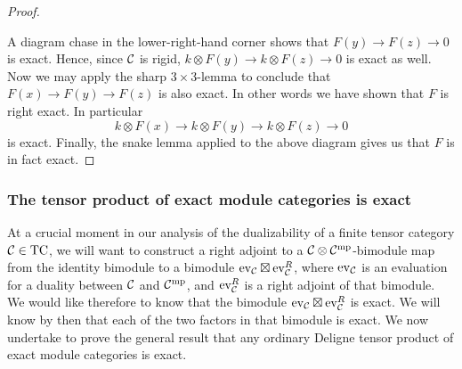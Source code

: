 \documentclass{amsart}
\begin{document}
\begin{proof}
\begin{center}
	\end{center}
	A diagram chase in the lower-right-hand corner shows that $F(y) \to F(z) \to 0$ is exact. Hence, since $\mathcal C$ is rigid,
		$k \otimes F(y) \to k \otimes F(z) \to 0$
	is exact as well. Now we may apply the sharp $3 \times 3$-lemma \cite[Lem. 2]{MR1004230} to conclude that $F(x) \to F(y) \to F(z)$ is also exact. In other words we have shown that $F$ is right exact. In particular
	\begin{equation*}
		k \otimes F(x) \to k \otimes F(y) \to k \otimes F(z) \to 0
	\end{equation*} 
	is exact. Finally, the snake lemma applied to the above diagram gives us that $F$ is in fact exact. 
\end{proof}

\subsubsection{The tensor product of exact module categories is exact} \label{sec:tensorexact}

At a crucial moment in our analysis of the dualizability of a finite tensor category $\mathcal C \in \mathrm{TC}$, we will want to construct a right adjoint to a $\mathcal C \otimes \mathcal C^{\mathrm{mp}}$-bimodule map from the identity bimodule to a bimodule $\mathrm{ev}_\mathcal C \boxtimes \mathrm{ev}_\mathcal C^R$, where $\mathrm{ev}_\mathcal C$ is an evaluation for a duality between $\mathcal C$ and $\mathcal C^{\mathrm{mp}}$, and $\mathrm{ev}_\mathcal C^R$ is a right adjoint of that bimodule.  We would like therefore to know that the bimodule $\mathrm{ev}_\mathcal C \boxtimes \mathrm{ev}_\mathcal C^R$ is exact.  We will know by then that each of the two factors in that bimodule is exact.  We now undertake to prove the general result that any ordinary Deligne tensor product of exact module categories is exact.
\end{document}

